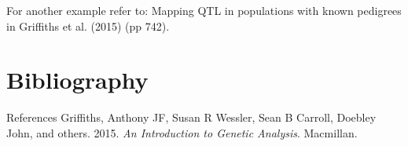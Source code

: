 \documentclass[11pt,dvipsnames,ignorenonframetext,aspectratio=169]{beamer}
\newlength{\cslhangindent}
\newenvironment{cslreferences}%
    {\setlength{\parindent}{0pt}%
    \everypar{\setlength{\hangindent}{\cslhangindent}}\ignorespaces}%
    {\par}
\begin{document}
\begin{frame}{}
\protect\hypertarget{section-15}{}
For another example refer to: Mapping QTL in populations with known
pedigrees in Griffiths et al. (2015) (pp 742).
\end{frame}

\hypertarget{bibliography}{%
\section{Bibliography}\label{bibliography}}

\begin{frame}{References}
\protect\hypertarget{references}{}
\hypertarget{refs}{}
\begin{cslreferences}
\leavevmode\hypertarget{ref-griffiths2015introduction}{}%
Griffiths, Anthony JF, Susan R Wessler, Sean B Carroll, Doebley John,
and others. 2015. \emph{An Introduction to Genetic Analysis}. Macmillan.
\end{cslreferences}
\end{frame}
\end{document}
